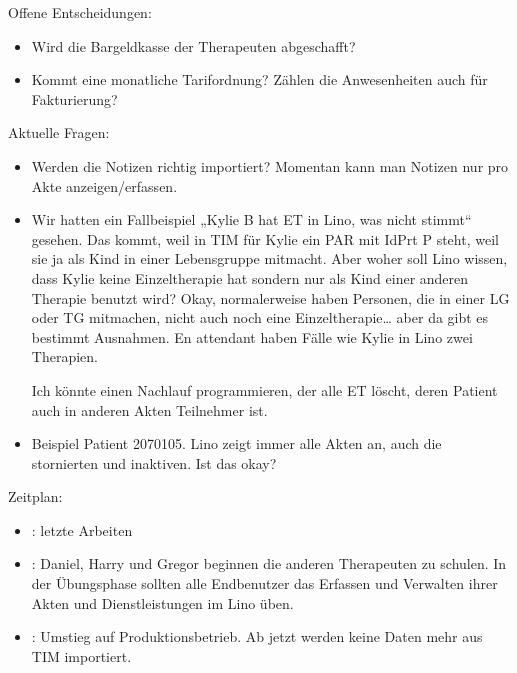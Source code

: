 \documentclass[letterpaper,10pt,ngerman]{sphinxmanual}
\begin{document}
Offene Entscheidungen:
\begin{itemize}
\item {} 
Wird die Bargeldkasse der Therapeuten abgeschafft?

\item {} 
Kommt eine monatliche Tarifordnung? Zählen die Anwesenheiten auch
für Fakturierung?

\end{itemize}

Aktuelle Fragen:
\begin{itemize}
\item {} 
Werden die Notizen richtig importiert? Momentan kann man Notizen nur
pro Akte anzeigen/erfassen.

\item {} 
Wir hatten ein Fallbeispiel „Kylie B hat ET in Lino, was nicht
stimmt“ gesehen. Das kommt, weil in TIM für Kylie ein PAR mit IdPrt
P steht, weil sie ja als Kind in einer Lebensgruppe mitmacht. Aber
woher soll Lino wissen, dass Kylie keine Einzeltherapie hat sondern
nur als Kind einer anderen Therapie benutzt wird? Okay,
normalerweise haben Personen, die in einer LG oder TG mitmachen,
nicht auch noch eine Einzeltherapie… aber da gibt es bestimmt
Ausnahmen. En attendant haben Fälle wie Kylie in Lino zwei
Therapien.

Ich könnte einen Nachlauf programmieren, der alle ET löscht, deren
Patient auch in anderen Akten Teilnehmer ist.

\item {} 
Beispiel Patient 2070105.  Lino zeigt immer alle Akten an, auch die
stornierten und inaktiven.  Ist das okay?

\end{itemize}

Zeitplan:
\begin{itemize}
\item {} 
 : letzte Arbeiten

\item {} 
 : Daniel, Harry und Gregor beginnen die anderen
Therapeuten zu schulen.  In der Übungsphase sollten alle Endbenutzer
das Erfassen und Verwalten ihrer Akten und Dienstleistungen im Lino
üben.

\item {} 
 : Umstieg auf Produktionsbetrieb. Ab jetzt werden
keine Daten mehr aus TIM importiert.

\end{itemize}
\end{document}
